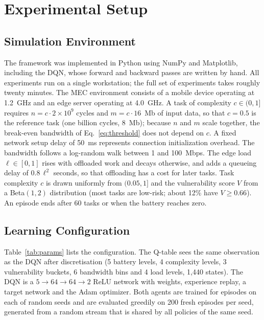 \documentclass{ieeeaccess}
\begin{document}
\section{Experimental Setup}
\label{sec:setup}
\subsection{Simulation Environment}
The framework was implemented in Python using NumPy and Matplotlib, including the DQN, whose forward and backward passes are written by hand. All experiments run on a single workstation; the full set of experiments takes roughly twenty minutes. The MEC environment consists of a mobile device operating at 1.2~GHz and an edge server operating at 4.0~GHz. A task of complexity $c\in(0,1]$ requires $n = c\cdot 2\times10^{9}$ cycles and $m = c\cdot 16$~Mb of input data, so that $c=0.5$ is the reference task (one billion cycles, 8~Mb); because $n$ and $m$ scale together, the break-even bandwidth of Eq.~\eqref{eq:threshold} does not depend on $c$. A fixed network setup delay of 50~ms represents connection initialization overhead. The bandwidth follows a log-random walk between 1 and 100~Mbps. The edge load $\ell\in[0,1]$ rises with offloaded work and decays otherwise, and adds a queueing delay of $0.8\,\ell^{2}$ seconds, so that offloading has a cost for later tasks. Task complexity $c$ is drawn uniformly from $(0.05,1]$ and the vulnerability score $V$ from a Beta$(1,2)$ distribution (most tasks are low-risk; about 12\% have $V\ge0.66$). An episode ends after 60 tasks or when the battery reaches zero.

\subsection{Learning Configuration}
Table~\ref{tab:params} lists the configuration. The Q-table sees the same observation as the DQN after discretisation (5 battery levels, 4 complexity levels, 3 vulnerability buckets, 6 bandwidth bins and 4 load levels, 1{,}440 states). The DQN is a $5\to64\to64\to2$ ReLU network with \DqnParams{} weights, experience replay, a target network and the Adam optimizer. Both agents are trained for \NEpisodes{} episodes on each of \NSeeds{} random seeds and are evaluated greedily on 200 fresh episodes per seed, generated from a random stream that is shared by all policies of the same seed.
\end{document}
